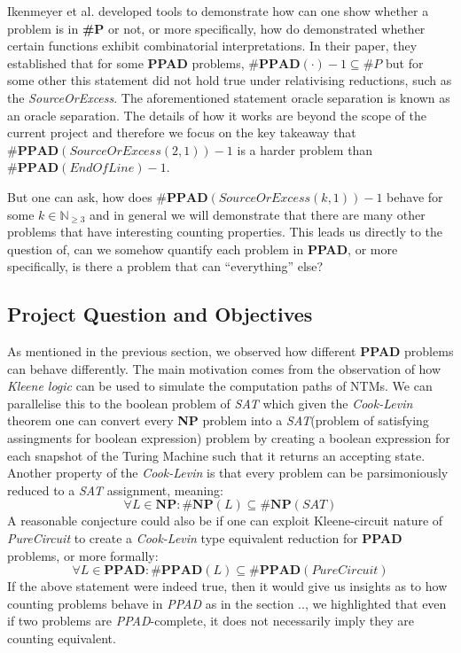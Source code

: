 Ikenmeyer et al. \cite{ikenmeyer_WhatWhatNot_2022} developed tools to demonstrate how can one
show whether a problem is in \textbf{\#P} or not, or more specifically, how do demonstrated
whether certain functions exhibit combinatorial interpretations.
In their paper, they established that for some \textbf{PPAD} problems,
$\textbf{\#PPAD}(\cdot) -1 \subseteq \#P$ but for some other this statement did not hold true under relativising reductions,
such as the \textit{SourceOrExcess}. The aforementioned statement oracle separation is known as an
oracle separation. The details of how it works
are beyond the scope of the current project and therefore we focus on the key takeaway that
$\textbf{\#PPAD}(\textit{SourceOrExcess}(2,1)) -1$ is a harder problem than $\textbf{\#PPAD}(\textit{EndOfLine}) -1$.

But one can ask, how does $\textbf{\#PPAD}(\textit{SourceOrExcess}(k,1)) -1$ behave for some $k \in \mathbb{N}_{\geq 3}$
and in general we will demonstrate that there are many other problems that have interesting counting properties.
This leads us directly to the question of, can we somehow quantify each problem in \textbf{PPAD}, or more 
specifically, is there a problem that can ``everything'' else?


\subsection{Project Question and Objectives}

As mentioned in the previous section, we observed how different \textbf{PPAD} problems can behave differently.
The main motivation comes from the observation of how \textit{Kleene logic} can be used to simulate the computation
paths of NTMs. We can parallelise this to the boolean problem of \textit{SAT} which
given the \textit{Cook-Levin} theorem \cite{cook_ComplexityTheoremprovingProcedures_1971}
one can convert every \textbf{NP} problem into a \textit{SAT}(problem of satisfying assingments for boolean expression) problem by
creating a boolean expression for each snapshot of the Turing Machine such that it returns an accepting state.
Another property of the \textit{Cook-Levin} is that every problem can be parsimoniously reduced to a
\textit{SAT} assignment, meaning:
$$
    \forall L \in \textbf{NP}: \textbf{\#NP}(L) \subseteq  \textbf{\#NP}(\textit{SAT})
$$
A reasonable conjecture could also be if one can exploit Kleene-circuit nature of \textit{PureCircuit} to
create a \textit{Cook-Levin} type equivalent reduction for \textbf{PPAD} problems, or more formally:
$$
    \forall L \in \textbf{PPAD}: \textbf{\#PPAD}(L) \subseteq  \textbf{\#PPAD}(\textit{PureCircuit})
$$
If the above statement were indeed true, then it would give us insights as to how counting problems behave in \textit{PPAD}
as in the section {..}, we highlighted that even if two problems are \textit{PPAD}-complete, it does not necessarily imply
they are counting equivalent.

